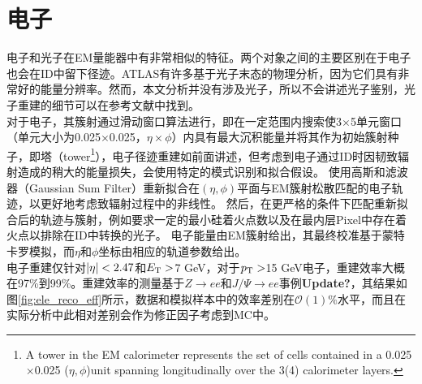 \section{电子}
电子和光子在EM量能器中有非常相似的特征。两个对象之间的主要区别在于电子也会在ID中留下径迹。ATLAS有许多基于光子末态的物理分析，因为它们具有非常好的能量分辨率。然而，本文分析并没有涉及光子，所以不会讲述光子鉴别，光子重建的细节可以在参考文献\cite{ATLAS-CONF-2012-123}中找到。\\
对于电子，其簇射通过滑动窗口算法进行\cite{Lampl:1099735}，即在一定范围内搜索使3$\times$5单元窗口（单元大小为0.025$\times$0.025，$\eta\times\phi$）内具有最大沉积能量并将其作为初始簇射种子，即塔（tower\footnote{A tower in the EM calorimeter represents the set of cells contained in a 0.025$\times$0.025 ($\eta,\phi$)unit spanning longitudinally over the 3(4) calorimeter layers.}），电子径迹重建如前面讲述，但考虑到电子通过ID时因韧致辐射造成的稍大的能量损失，会使用特定的模式识别和拟合假设。
使用高斯和滤波器（Gaussian Sum Filter）\cite{ATLAS-CONF-2012-047}重新拟合在$(\eta,\phi)$平面与EM簇射松散匹配的电子轨迹，以更好地考虑致辐射过程中的非线性。 然后，在更严格的条件下匹配重新拟合后的轨迹与簇射，例如要求一定的最小硅着火点数以及在最内层Pixel中存在着火点以排除在ID中转换的光子。 电子能量由EM簇射给出，其最终校准基于蒙特卡罗模拟\cite{Aad2014-cali}，而$\eta$和$\phi$坐标由相应的轨道参数给出。\\
电子重建仅针对$|\eta|<2.47$和$E_{\text{T}} >$7 GeV，对于$p_{\text{T}}>$15 GeV电子，重建效率大概在97\%到99\%。重建效率的测量基于$Z\rightarrow ee$和$J/\Psi\rightarrow ee$事例\cite{ATLAS-CONF-2016-024}\textbf{Update?}，其结果如图\ref{fig:ele_reco_eff}所示，数据和模拟样本中的效率差别在$\mathcal{O}(1)\%$水平，而且在实际分析中此相对差别会作为修正因子考虑到MC中。
